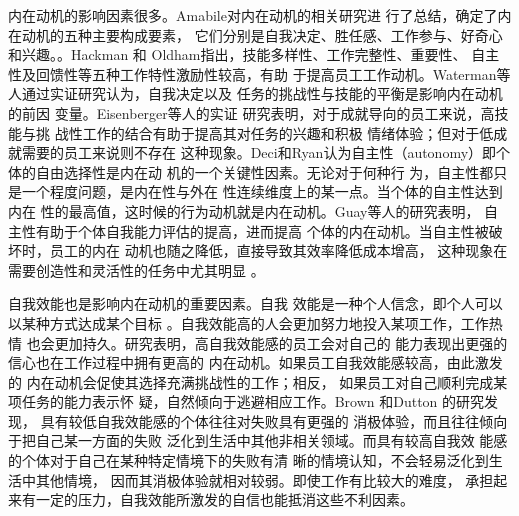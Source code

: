 \documentclass[12pt,a4paper,cs4size]{ctexart}
\begin{document}
内在动机的影响因素很多。Amabile对内在动机的相关研究进
行了总结，确定了内在动机的五种主要构成要素，
它们分别是自我决定、胜任感、工作参与、好奇心
和兴趣\cite{amabile1996cc}。。Hackman 和
Oldham指出，技能多样性、工作完整性、重要性、
自主性及回馈性等五种工作特性激励性较高，有助
于提高员工工作动机\cite{hackman1975djd}。Waterman等人通过实证研究认为，自我决定以及
任务的挑战性与技能的平衡是影响内在动机的前因
变量\cite{AlanSWaterman11012003}。Eisenberger等人的实证
研究表明，对于成就导向的员工来说，高技能与挑
战性工作的结合有助于提高其对任务的兴趣和积极
情绪体验；但对于低成就需要的员工来说则不存在
这种现象\cite{Eisenberger2005}。Deci和Ryan认为自主性（autonomy）即个体的自由选择性是内在动
机的一个关键性因素。无论对于何种行
为，自主性都只是一个程度问题，是内在性与外在
性连续维度上的某一点。当个体的自主性达到内在
性的最高值，这时候的行为动机就是内在动机\cite{ryan2000sdt}。Guay等人的研究表明，
自主性有助于个体自我能力评估的提高，进而提高
个体的内在动机。当自主性被破坏时，员工的内在
动机也随之降低，直接导致其效率降低成本增高，
这种现象在需要创造性和灵活性的任务中尤其明显
\cite{FredericGuay06012001}。

自我效能也是影响内在动机的重要因素。自我
效能是一种个人信念，即个人可以以某种方式达成某个目标
\cite{ormrod2003epd}。自我效能高的人会更加努力地投入某项工作，工作热情
也会更加持久\cite{schunk1990gsa}。研究表明，高自我效能感的员工会对自己的
能力表现出更强的信心也在工作过程中拥有更高的
内在动机。如果员工自我效能感较高，由此激发的
内在动机会促使其选择充满挑战性的工作；相反，
如果员工对自己顺利完成某项任务的能力表示怀
疑，自然倾向于逃避相应工作\cite{David2007}\cite{bandura2003nse}。Brown 和Dutton 的研究发现，
具有较低自我效能感的个体往往对失败具有更强的
消极体验，而且往往倾向于把自己某一方面的失败
泛化到生活中其他非相关领域。而具有较高自我效
能感的个体对于自己在某种特定情境下的失败有清
晰的情境认知，不会轻易泛化到生活中其他情境，
因而其消极体验就相对较弱\cite{brown1995tvc}。即使工作有比较大的难度，
承担起来有一定的压力，自我效能所激发的自信也能抵消这些不利因素。
\end{document}
